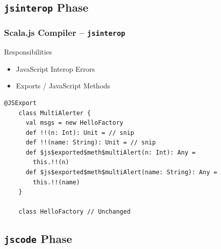 \documentclass{beamer}
\begin{document}
\subsection{\texttt{jsinterop} Phase}

\begin{frame}[fragile]
  \frametitle{Scala.js Compiler -- \texttt{jsinterop}}

  \begin{block}{Responsibilities}
    \begin{itemize}
    \item JavaScript Interop Errors
    \item Exports / JavaScript Methods
    \end{itemize}
  \end{block}

  \pause

  \begin{lstlisting}[gobble=4]
    @JSExport
    class MultiAlerter {
      val msgs = new HelloFactory
      def !!(n: Int): Unit = // snip
      def !!(name: String): Unit = // snip
      def $js$exported$meth$multiAlert(n: Int): Any =
        this.!!(n)
      def $js$exported$meth$multiAlert(name: String): Any =
        this.!!(name)
    }

    class HelloFactory // Unchanged
  \end{lstlisting}

\end{frame}

\subsection{\texttt{jscode} Phase}

\end{document}

